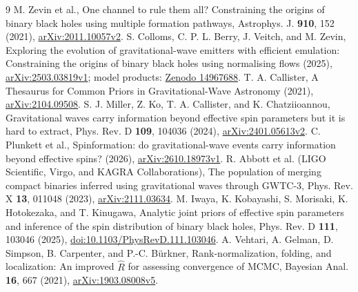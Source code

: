 \begin{thebibliography}{9}
 M. Zevin et al., One channel to rule them all? Constraining the origins of binary black holes using multiple formation pathways, Astrophys. J. \textbf{910}, 152 (2021), \href{https://arxiv.org/abs/2011.10057v2}{arXiv:2011.10057v2}.
 S. Colloms, C. P. L. Berry, J. Veitch, and M. Zevin, Exploring the evolution of gravitational-wave emitters with efficient emulation: Constraining the origins of binary black holes using normalising flows (2025), \href{https://arxiv.org/abs/2503.03819v1}{arXiv:2503.03819v1}; model products: \href{https://zenodo.org/records/14967688}{Zenodo 14967688}.
 T. A. Callister, A Thesaurus for Common Priors in Gravitational-Wave Astronomy (2021), \href{https://arxiv.org/abs/2104.09508}{arXiv:2104.09508}.
 S. J. Miller, Z. Ko, T. A. Callister, and K. Chatziioannou, Gravitational waves carry information beyond effective spin parameters but it is hard to extract, Phys. Rev. D \textbf{109}, 104036 (2024), \href{https://arxiv.org/abs/2401.05613v2}{arXiv:2401.05613v2}.
 C. Plunkett et al., Spinformation: do gravitational-wave events carry information beyond effective spins? (2026), \href{https://arxiv.org/abs/2610.18973v1}{arXiv:2610.18973v1}.
 R. Abbott et al. (LIGO Scientific, Virgo, and KAGRA Collaborations), The population of merging compact binaries inferred using gravitational waves through GWTC-3, Phys. Rev. X \textbf{13}, 011048 (2023), \href{https://arxiv.org/abs/2111.03634}{arXiv:2111.03634}.
 M. Iwaya, K. Kobayashi, S. Morisaki, K. Hotokezaka, and T. Kinugawa, Analytic joint priors of effective spin parameters and inference of the spin distribution of binary black holes, Phys. Rev. D \textbf{111}, 103046 (2025), \href{https://doi.org/10.1103/PhysRevD.111.103046}{doi:10.1103/PhysRevD.111.103046}.
 A. Vehtari, A. Gelman, D. Simpson, B. Carpenter, and P.-C. B\"urkner, Rank-normalization, folding, and localization: An improved $\widehat R$ for assessing convergence of MCMC, Bayesian Anal. \textbf{16}, 667 (2021), \href{https://arxiv.org/abs/1903.08008v5}{arXiv:1903.08008v5}.
\end{thebibliography}
